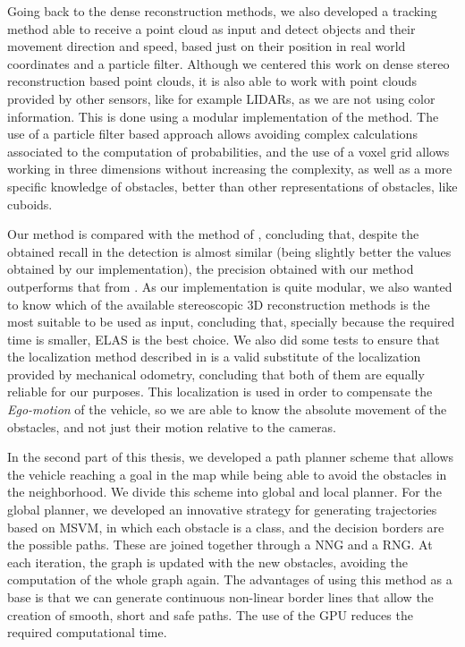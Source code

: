 Going back to the dense reconstruction methods, we also developed a tracking method able to receive a point cloud as input and detect objects and their movement direction and speed, based just on their position in real world coordinates and a particle filter. Although we centered this work on dense stereo reconstruction based point clouds, it is also able to work with point clouds provided by other sensors, like for example \acp{LIDAR}, as we are not using color information. This is done using a modular implementation of the method. The use of a particle filter based approach allows avoiding complex calculations associated to the computation of probabilities, and the use of a voxel grid allows working in three dimensions without increasing the complexity, as well as a more specific knowledge of obstacles, better than other representations of obstacles, like cuboids.

Our method is compared with the method of \cite{danescu2012particle}, concluding that, despite the obtained recall in the detection is almost similar (being slightly better the values obtained by our implementation), the precision obtained with our method outperforms that from \cite{danescu2012particle}. As our implementation is quite modular, we also wanted to know which of the available stereoscopic 3D reconstruction methods is the most suitable to be used as input, concluding that, specially because the required time is smaller, \ac{ELAS} is the best choice. We also did some tests to ensure that the localization method described in \cite{geiger2011stereoscan} is a valid substitute of the localization provided by mechanical odometry, concluding that both of them are equally reliable for our purposes. This localization is used in order to compensate the \emph{Ego-motion} of the vehicle, so we are able to know the absolute movement of the obstacles, and not just their motion relative to the cameras.

In the second part of this thesis, we developed a path planner scheme that allows the vehicle reaching a goal in the map while being able to avoid the obstacles in the neighborhood. We divide this scheme into global and local planner. For the global planner, we developed an innovative strategy for generating trajectories based on \ac{MSVM}, in which each obstacle is a class, and the decision borders are the possible paths. These are joined together through a \acl{NNG} and a \acl{RNG}. At each iteration, the graph is updated with the new obstacles, avoiding the computation of the whole graph again. The advantages of using this method as a base is that we can generate continuous non-linear border lines that allow the creation of smooth, short and safe paths. The use of the \ac{GPU} reduces the required computational time.

